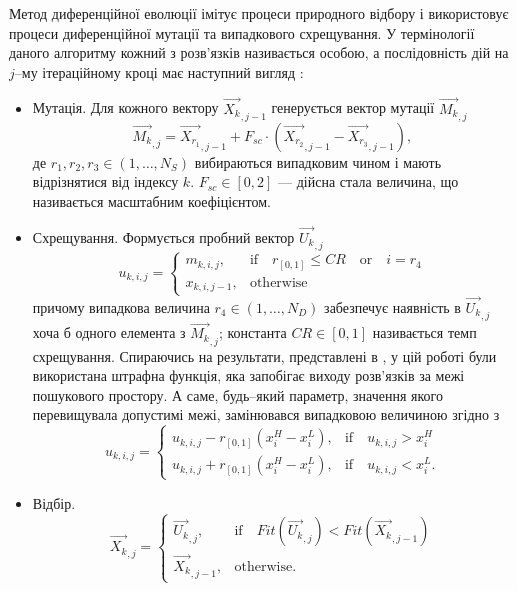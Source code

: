 Метод диференційної еволюції імітує процеси природного відбору і використовує процеси диференційної мутації та випадкового схрещування.
У термінології даного алгоритму кожний з розв'язків називається особою, а послідовність дій на $j$--му ітераційному кроці має наступний вигляд \cite{DEWang,DEModif}:
\begin{itemize}[leftmargin=0cm,itemindent=1em]
  \item Мутація. Для кожного вектору $\overrightarrow{X_{k}}_{,j-1}$ генерується вектор мутації $\overrightarrow{M_{k}}_{,j}$
  \begin{equation}
 \label{eqDEMut}
 \overrightarrow{M_{k}}_{,j}=\overrightarrow{X_{r_1}}_{,j-1}+F_{sc}\cdot\left(\overrightarrow{X_{r_2}}_{,j-1}-\overrightarrow{X_{r_3}}_{,j-1}\right),
 \end{equation}
 де $r_1,r_2,r_3\in(1,\ldots,N_S)$ вибираються випадковим чином і мають відрізнятися від індексу $k$.
 $F_{sc}\in[0,2]$  --- дійсна стала величина, що називається масштабним коефіцієнтом.


  \item Схрещування. Формується пробний вектор $\overrightarrow{U_{k}}_{,j}$
  \begin{equation}
 \label{eqDECros}
 u_{k,i,j}=\left\{
 \begin{array}{ll}
 m_{k,i,j},& \text{if} \quad r_{[0,1]}\leq C\!R \quad \text{or} \quad i=r_{4}\\
 x_{k,i,j-1},& \text{otherwise}
 \end{array}
 \right.
 \end{equation}
 причому випадкова величина $r_4\in(1,\ldots,N_D)$
забезпечує наявність в $\overrightarrow{U_{k}}_{,j}$ хоча б одного елемента з $\overrightarrow{M_{k}}_{,j}$;
 константа $C\!R\in[0,1]$ називається темп схрещування.
  Спираючись на результати, представлені в \cite{P-DE_Ishaque},
  у цій роботі  були використана штрафна функція, яка запобігає виходу розв'язків за межі пошукового простору.
  А саме, будь--який параметр, значення якого перевищувала допустимі межі, замінювався випадковою величиною згідно з
    \begin{equation}
 \label{eqDEPen}
 u_{k,i,j}=\left\{
 \begin{array}{ll}
 u_{k,i,j}-r_{[0,1]}(x_i^H-x_i^L),& \text{if} \quad u_{k,i,j}>x_i^H\\
 u_{k,i,j}+r_{[0,1]}(x_i^H-x_i^L),& \text{if} \quad u_{k,i,j}<x_i^L.
 \end{array}
 \right.
 \end{equation}
  \item Відбір.
      \begin{equation}
 \label{eqDESel}
 \overrightarrow{X_{k}}_{,j}=\left\{
 \begin{array}{ll}
\overrightarrow{U_{k}}_{,j},& \text{if} \quad Fit(\overrightarrow{U_k}_{,j})<Fit(\overrightarrow{X_k}_{,j-1})\\
 \overrightarrow{X_{k}}_{,j-1},& \text{otherwise}.
 \end{array}
 \right.
 \end{equation}

\end{itemize}
